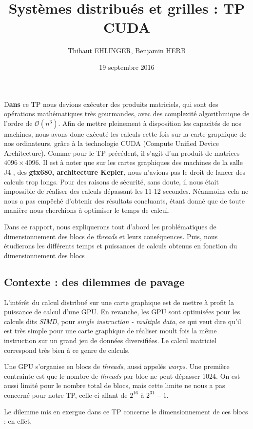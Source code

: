 \documentclass[	DIV=calc,%
							paper=a4,%
							fontsize=11pt%
							]{scrartcl}	 					%
\title{Systèmes distribués et grilles : TP CUDA}					%
\author{Thibaut EHLINGER, Benjamin HERB }											%
\date{19 septembre 2016}
\newcommand{\initial}[1]{%
     \lettrine[lines=3,lhang=0.3,nindent=0em]{
     				\color{DarkGoldenrod}
     				{\textsf{#1}}}{}}
\begin{document}
\maketitle
\thispagestyle{fancy} 			%
\initial{D}\textbf{ans} ce TP nous devions exécuter des produits matriciels, qui sont des opérations mathématiques très gourmandes, avec des complexité algorithmique de l'ordre de $ \mathcal{O}(n^3)$. Afin de mettre pleinement à disposition les capacités de nos machines, nous avons donc exécuté les calculs cette fois sur la carte graphique de nos ordinateurs, grâce à la technologie CUDA (Compute Unified Device Architecture). Comme pour le TP précédent, il s'agit d'un produit de matrices $ 4096 \times 4096$. Il est à noter que sur les cartes graphiques des machines de la salle J4 , des \textbf{gtx680, architecture Kepler}, nous n'avions pas le droit de lancer des calculs trop longs. Pour des raisons de sécurité, sans doute, il nous était impossible de réaliser des calculs dépassant les 11-12 secondes. Néanmoins cela ne nous a pas empêché d'obtenir des résultats concluants, étant donné que de toute manière nous cherchions à optimiser le temps de calcul.\par
Dans ce rapport, nous expliquerons tout d'abord les problématiques de dimensionnement des blocs de \textit{threads} et leurs conséquences. Puis, nous étudierons les différents temps et puissances de calculs obtenus en fonction du dimensionnement des blocs

\subsection*{Contexte : des dilemmes de pavage}
L'intérêt du calcul distribué sur une carte graphique est de mettre à profit la puissance de calcul d'une GPU. En revanche, les GPU sont optimisées pour les calculs dits \textit{SIMD}, pour \textit{single instruction - multiple data}, ce qui veut dire qu'il est très simple pour une carte graphique de réaliser moult fois la même instruction sur un grand jeu de données diversifiées. Le calcul matriciel correspond très bien à ce genre de calculs.\par
Une GPU s'organise en blocs de \textit{threads}, aussi appelés \textit{warps}. Une première contrainte est que le nombre de \textit{threads} par bloc ne peut dépasser 1024. On est aussi limité pour le nombre total de blocs, mais cette limite ne nous a pas concerné pour notre TP, celle-ci allant de $2^{16}$ à $2^{31} - 1$.\par
Le dilemme mis en exergue dans ce TP concerne le dimensionnement de ces blocs : en effet, 
\end{document}
